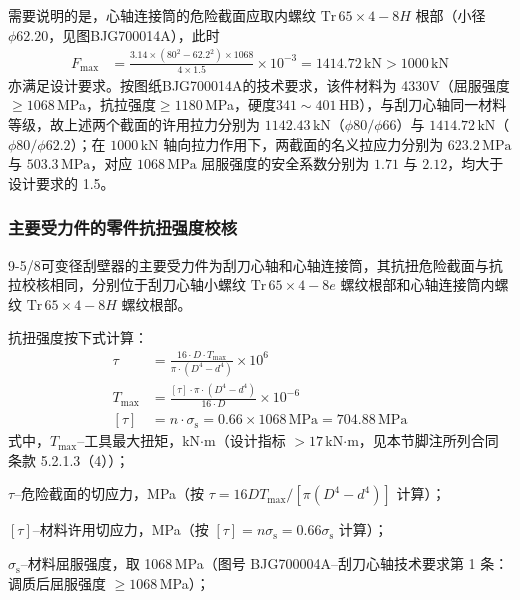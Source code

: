 需要说明的是，心轴连接筒的危险截面应取内螺纹 $\mathrm{Tr}\,65\times4-8H$ 根部（小径 $\phi 62.20$，见图BJG700014A），此时
\begin{equation}
    \begin{aligned}
    F_{\max} &= \frac{3.14 \times (80^2 - 62.2^2) \times 1068}{4 \times 1.5} \times 10^{-3}
             = 1414.72\,\mathrm{kN} > 1000\,\mathrm{kN}
    \end{aligned}
\end{equation}
亦满足设计要求。按图纸BJG700014A的技术要求，该件材料为 4330V（屈服强度$\ge 1068$\,MPa，抗拉强度$\ge 1180$\,MPa，硬度$341\sim401$\,HB），与刮刀心轴同一材料等级，故上述两个截面的许用拉力分别为 $1142.43\,\mathrm{kN}$（$\phi 80/\phi 66$）与 $1414.72\,\mathrm{kN}$（$\phi 80/\phi 62.2$）；在 $1000\,\mathrm{kN}$ 轴向拉力作用下，两截面的名义拉应力分别为 $623.2\,\mathrm{MPa}$ 与 $503.3\,\mathrm{MPa}$，对应 $1068\,\mathrm{MPa}$ 屈服强度的安全系数分别为 $1.71$ 与 $2.12$，均大于设计要求的 1.5。


\subsubsection{主要受力件的零件抗扭强度校核}

9-5/8\inch 可变径刮壁器的主要受力件为刮刀心轴和心轴连接筒，其抗扭危险截面与抗拉校核相同，分别位于刮刀心轴小螺纹 $\mathrm{Tr}\,65 \times 4-8e$ 螺纹根部和心轴连接筒内螺纹 $\mathrm{Tr}\,65 \times 4-8H$ 螺纹根部。

抗扭强度按下式计算：
\begin{equation}
    \begin{aligned}
        \tau &= \frac{16 \cdot D \cdot T_{\max}}{\pi \cdot (D^4 - d^4)} \times 10^{6} \\
        T_{\max} &= \frac{[\tau] \cdot \pi \cdot (D^4 - d^4)}{16 \cdot D} \times 10^{-6} \\
        [\tau] &= n \cdot \sigma_{\mathrm{s}} = 0.66 \times 1068\,\mathrm{MPa} = 704.88\,\mathrm{MPa}
    \end{aligned}
\end{equation}
式中，$T_{\max}$--工具最大扭矩，kN$\cdot$m（设计指标 $>17$\,kN$\cdot$m，见本节脚注所列合同条款 5.2.1.3（4））；

$\tau$--危险截面的切应力，MPa（按 $\tau = 16DT_{\max}/[\pi(D^4-d^4)]$ 计算）；

$[\tau]$--材料许用切应力，MPa（按 $[\tau]=n\sigma_{\mathrm{s}} = 0.66\sigma_{\mathrm{s}}$ 计算）；

$\sigma_{\mathrm{s}}$--材料屈服强度，取 1068\,MPa（图号 BJG700004A--刮刀心轴技术要求第 1 条：调质后屈服强度 $\ge 1068$\,MPa）；

